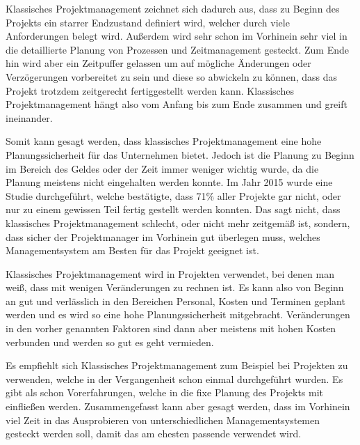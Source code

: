 

Klassisches Projektmanagement zeichnet sich dadurch aus, dass zu Beginn des Projekts ein starrer Endzustand definiert wird, welcher durch viele Anforderungen belegt wird. Außerdem wird sehr schon im Vorhinein sehr viel in die detaillierte Planung von Prozessen und Zeitmanagement gesteckt. Zum Ende hin wird aber ein Zeitpuffer gelassen um auf mögliche Änderungen oder Verzögerungen vorbereitet zu sein und diese so abwickeln zu können, dass das Projekt trotzdem zeitgerecht fertiggestellt werden kann. Klassisches Projektmanagement hängt also vom Anfang bis zum Ende zusammen und greift ineinander. \cite{Projectman.}

Somit kann gesagt werden, dass klassisches Projektmanagement eine hohe Planungssicherheit für das Unternehmen bietet. Jedoch ist die Planung zu Beginn im Bereich des Geldes oder der Zeit immer weniger wichtig wurde, da die Planung meistens nicht eingehalten werden konnte. Im Jahr 2015 wurde eine Studie durchgeführt, welche bestätigte, dass 71\% aller Projekte gar nicht, oder nur zu einem gewissen Teil fertig gestellt werden konnten. Das sagt nicht, dass klassisches Projektmanagement schlecht, oder nicht mehr zeitgemäß ist, sondern, dass sicher der Projektmanager im Vorhinein gut überlegen muss, welches Managementsystem am Besten für das Projekt geeignet ist.  \cite{Projectman.}


Klassisches Projektmanagement wird in Projekten verwendet, bei denen man weiß, dass mit wenigen Veränderungen zu rechnen ist. Es kann also von Beginn an gut und verlässlich in den Bereichen Personal, Kosten und Terminen geplant werden und es wird so eine hohe Planungssicherheit mitgebracht. Veränderungen in den vorher genannten Faktoren sind dann aber meistens mit hohen Kosten verbunden und werden so gut es geht vermieden. \cite{Projectman.}

Es empfiehlt sich Klassisches Projektmanagement zum Beispiel bei Projekten zu verwenden, welche in der Vergangenheit schon einmal durchgeführt wurden. Es gibt als schon Vorerfahrungen, welche in die fixe Planung des Projekts mit einfließen werden. Zusammengefasst kann aber gesagt werden, dass im Vorhinein viel Zeit in das Ausprobieren von unterschiedlichen Managementsystemen gesteckt werden soll, damit das am ehesten passende verwendet wird. \cite{Projectman.}


